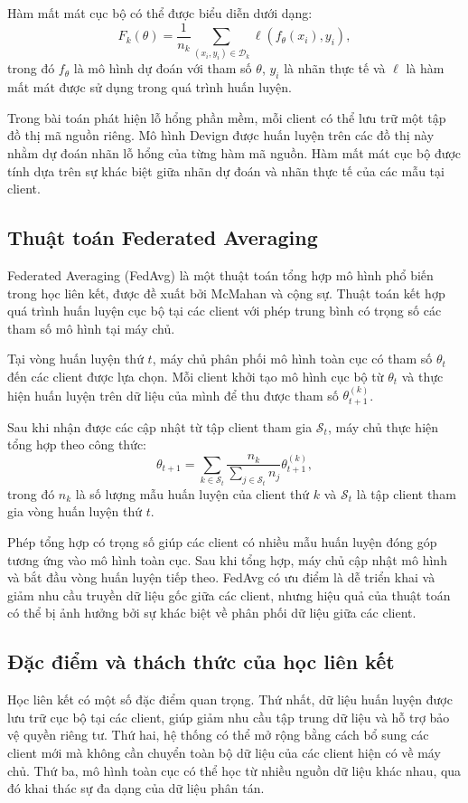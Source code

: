 Hàm mất mát cục bộ có thể được biểu diễn dưới dạng:
\[
	F_k(\theta)
	= \frac{1}{n_k}
	\sum_{(x_i,y_i)\in\mathcal{D}_k}
	\ell(f_{\theta}(x_i),y_i),
\]
trong đó $f_{\theta}$ là mô hình dự đoán với tham số $\theta$, $y_i$ là nhãn thực tế và $\ell$ là
hàm mất mát được sử dụng trong quá trình huấn luyện.

Trong bài toán phát hiện lỗ hổng phần mềm, mỗi client có thể lưu trữ một tập đồ thị mã nguồn riêng.
Mô hình Devign được huấn luyện trên các đồ thị này nhằm dự đoán nhãn lỗ hổng của từng hàm mã nguồn.
Hàm mất mát cục bộ được tính dựa trên sự khác biệt giữa nhãn dự đoán và nhãn thực tế của các mẫu
tại client.

\subsection{Thuật toán Federated Averaging}

Federated Averaging (FedAvg) là một thuật toán tổng hợp mô hình phổ biến trong học liên kết, được
đề xuất bởi McMahan và cộng sự. Thuật toán kết hợp quá trình huấn luyện cục bộ tại các client với
phép trung bình có trọng số các tham số mô hình tại máy chủ.

Tại vòng huấn luyện thứ $t$, máy chủ phân phối mô hình toàn cục có tham số $\theta_t$ đến các
client được lựa chọn. Mỗi client khởi tạo mô hình cục bộ từ $\theta_t$ và thực hiện huấn luyện trên
dữ liệu của mình để thu được tham số $\theta_{t+1}^{(k)}$.

Sau khi nhận được các cập nhật từ tập client tham gia $\mathcal{S}_t$, máy chủ thực hiện tổng hợp
theo công thức:
\[
	\theta_{t+1}
	= \sum_{k\in\mathcal{S}_t}
	\frac{n_k}{\sum_{j\in\mathcal{S}_t}n_j}
	\theta_{t+1}^{(k)},
\]
trong đó $n_k$ là số lượng mẫu huấn luyện của client thứ $k$ và $\mathcal{S}_t$ là tập client tham
gia vòng huấn luyện thứ $t$.

Phép tổng hợp có trọng số giúp các client có nhiều mẫu huấn luyện đóng góp tương ứng vào mô hình
toàn cục. Sau khi tổng hợp, máy chủ cập nhật mô hình và bắt đầu vòng huấn luyện tiếp theo. FedAvg
có ưu điểm là dễ triển khai và giảm nhu cầu truyền dữ liệu gốc giữa các client, nhưng hiệu quả của
thuật toán có thể bị ảnh hưởng bởi sự khác biệt về phân phối dữ liệu giữa các client.

\subsection{Đặc điểm và thách thức của học liên kết}

Học liên kết có một số đặc điểm quan trọng. Thứ nhất, dữ liệu huấn luyện được lưu trữ cục bộ tại
các client, giúp giảm nhu cầu tập trung dữ liệu và hỗ trợ bảo vệ quyền riêng tư. Thứ hai, hệ thống
có thể mở rộng bằng cách bổ sung các client mới mà không cần chuyển toàn bộ dữ liệu của các client
hiện có về máy chủ. Thứ ba, mô hình toàn cục có thể học từ nhiều nguồn dữ liệu khác nhau, qua đó
khai thác sự đa dạng của dữ liệu phân tán.


